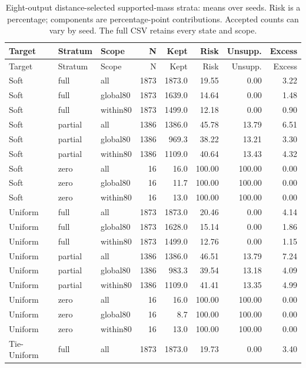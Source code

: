 \begingroup\small\setlength{\tabcolsep}{4pt}\setlength{\LTcapwidth}{\linewidth}
\begin{longtable}{lllrrrrr}
\caption{Eight-output distance-selected supported-mass strata: means over seeds. Risk is a percentage; components are percentage-point contributions. Accepted counts can vary by seed. The full CSV retains every state and scope.}\label{tab:new-strata}\\
\toprule Target & Stratum & Scope & N & Kept & Risk & Unsupp. & Excess\\\midrule\endfirsthead
\toprule Target & Stratum & Scope & N & Kept & Risk & Unsupp. & Excess\\\midrule\endhead
Soft & full & all & 1873 & 1873.0 & 19.55 & 0.00 & 3.22\\
Soft & full & global80 & 1873 & 1639.0 & 14.64 & 0.00 & 1.48\\
Soft & full & within80 & 1873 & 1499.0 & 12.18 & 0.00 & 0.90\\
Soft & partial & all & 1386 & 1386.0 & 45.78 & 13.79 & 6.51\\
Soft & partial & global80 & 1386 & 969.3 & 38.22 & 13.21 & 3.30\\
Soft & partial & within80 & 1386 & 1109.0 & 40.64 & 13.43 & 4.32\\
Soft & zero & all & 16 & 16.0 & 100.00 & 100.00 & 0.00\\
Soft & zero & global80 & 16 & 11.7 & 100.00 & 100.00 & 0.00\\
Soft & zero & within80 & 16 & 13.0 & 100.00 & 100.00 & 0.00\\
Uniform & full & all & 1873 & 1873.0 & 20.46 & 0.00 & 4.14\\
Uniform & full & global80 & 1873 & 1628.0 & 15.14 & 0.00 & 1.86\\
Uniform & full & within80 & 1873 & 1499.0 & 12.76 & 0.00 & 1.15\\
Uniform & partial & all & 1386 & 1386.0 & 46.51 & 13.79 & 7.24\\
Uniform & partial & global80 & 1386 & 983.3 & 39.54 & 13.18 & 4.09\\
Uniform & partial & within80 & 1386 & 1109.0 & 41.41 & 13.35 & 4.99\\
Uniform & zero & all & 16 & 16.0 & 100.00 & 100.00 & 0.00\\
Uniform & zero & global80 & 16 & 8.7 & 100.00 & 100.00 & 0.00\\
Uniform & zero & within80 & 16 & 13.0 & 100.00 & 100.00 & 0.00\\
Tie-Uniform & full & all & 1873 & 1873.0 & 19.73 & 0.00 & 3.40\\

\end{longtable}
